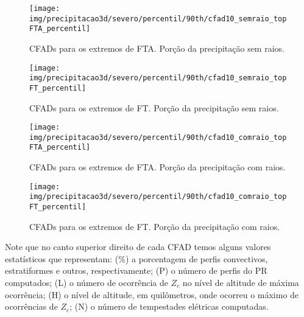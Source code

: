 \begin{sidewaysfigure}
\centering
\texttt{[image: img/precipitacao3d/severo/percentil/90th/cfad10\_semraio\_topFTA\_percentil]}
\caption{CFADs para os extremos de FTA. Porção da precipitação sem raios.}
\label{ftacfadwithout}
\end{sidewaysfigure} 
\begin{sidewaysfigure}
\centering
\texttt{[image: img/precipitacao3d/severo/percentil/90th/cfad10\_semraio\_topFT\_percentil]}
\caption{CFADs para os extremos de FT. Porção da precipitação sem raios.}
\label{ftcfadwithout}
\end{sidewaysfigure} 
\begin{sidewaysfigure}
  \centering
  \texttt{[image: img/precipitacao3d/severo/percentil/90th/cfad10\_comraio\_topFTA\_percentil]}
  \caption{CFADs para os extremos de FTA. Porção da precipitação com raios.}
  \label{ftacfadwith}   
\end{sidewaysfigure} 
\begin{sidewaysfigure}
  \centering
  \texttt{[image: img/precipitacao3d/severo/percentil/90th/cfad10\_comraio\_topFT\_percentil]}
  \caption{CFADs para os extremos de FT. Porção da precipitação com raios.}
  \label{ftcfadwith}   
\end{sidewaysfigure} 

Note que no canto superior direito de cada CFAD temos alguns valores estatísticos que representam: (\%)  a porcentagem de perfis convectivos, estratiformes e outros, respectivamente; (P) o número de perfis do PR computados; (L) o número de ocorrência de $Z_c$ no nível de altitude de máxima ocorrência; (H) o nível de altitude, em quilômetros, onde ocorreu o máximo de ocorrências de $Z_c$; (N) o número de tempestades elétricas computadas.


